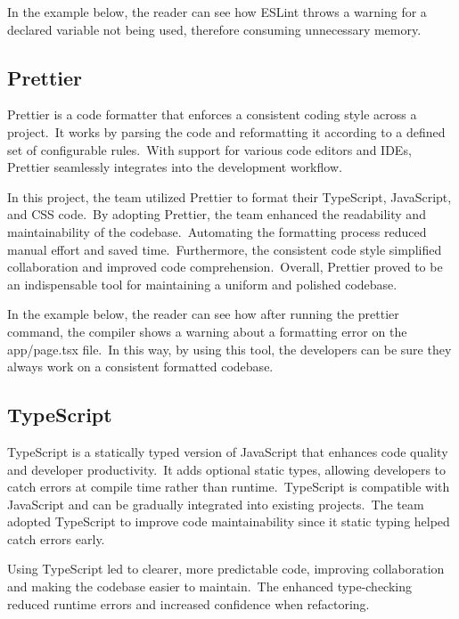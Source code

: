 In the example below, the reader can see how ESLint throws a warning for a declared variable not being used, therefore consuming unnecessary memory.



\subsection{Prettier}\label{subsec:prettier}

Prettier is a code formatter that enforces a consistent coding style across a project.\ It works by parsing the code and reformatting it according to a defined set of configurable rules.\ With support for various code editors and IDEs, Prettier seamlessly integrates into the development workflow.\cite[Prettier]{prettier}

In this project, the team utilized Prettier to format their TypeScript, JavaScript, and CSS code.\ By adopting Prettier, the team enhanced the readability and maintainability of the codebase.\ Automating the formatting process reduced manual effort and saved time.\ Furthermore, the consistent code style simplified collaboration and improved code comprehension.\ Overall, Prettier proved to be an indispensable tool for maintaining a uniform and polished codebase.

In the example below, the reader can see how after running the prettier command, the compiler shows a warning about a formatting error on the app/page.tsx file.\ In this way, by using this tool, the developers can be sure they always work on a consistent formatted codebase.



\subsection{TypeScript}\label{subsec:typescript}

TypeScript is a statically typed version of JavaScript that enhances code quality and developer productivity.\ It adds optional static types, allowing developers to catch errors at compile time rather than runtime.\ TypeScript is compatible with JavaScript and can be gradually integrated into existing projects.\ The team adopted TypeScript to improve code maintainability since it static typing helped catch errors early.\cite[TypeScript]{typescript}

Using TypeScript led to clearer, more predictable code, improving collaboration and making the codebase easier to maintain.\ The enhanced type-checking reduced runtime errors and increased confidence when refactoring.

